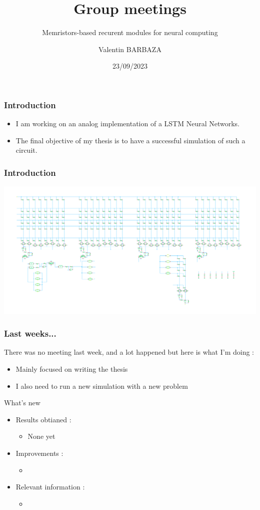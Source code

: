\documentclass[table]{beamer}
\title{Group meetings}
\subtitle{Memristors-based recurent modules for neural computing}
\author[V. BARBAZA]{Valentin BARBAZA}
\date{23/09/2023}
\begin{document}
\frame{\titlepage}


\begin{frame}
  \frametitle{Introduction}

  \begin{itemize}
      \color{text}
    \item I am working on an analog implementation of a LSTM Neural Networks.
    \item The final objective of my thesis is to have a successful simulation of such a circuit.
  \end{itemize}

\end{frame}

\begin{frame}
  \frametitle{Introduction}
  \centering\includegraphics[width=\textwidth]{lstm/lstm-np}
\end{frame}

\begin{frame}
  \frametitle{Last weeks...}

  There was no meeting last week, and a lot happened but here is what I'm doing :
  \begin{itemize}
    \item Mainly focused on writing the thesis
    \item I also need to run a new simulation with a new problem
  \end{itemize}
\end{frame}

\begin{frame}{What's new}
  \begin{itemize}
    \item Results obtianed :
      \begin{itemize}
          \color{text}
        \item None yet
      \end{itemize}
    \item Improvements :
      \begin{itemize}
          \color{text}
        \item
      \end{itemize}
    \item Relevant information :
      \begin{itemize}
          \color{text}
        \item
      \end{itemize}
  \end{itemize}
\end{frame}
\end{document}
